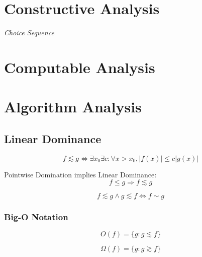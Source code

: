 \section{Constructive Analysis}\label{sec:constructive_analysis}

\emph{Choice Sequence}



\section{Computable Analysis}\label{sec:computable_analysis}

\section{Algorithm Analysis}\label{sec:algorithm_analysis}

\subsection{Linear Dominance}\label{sec:linear_dominance}

\[
    f \lesssim g \Leftrightarrow
    \exists x_0 \exists c : \forall x > x_0, |f(x)| \leq c |g(x)|
\]

Pointwise Domination implies Linear Dominance:
\[
    f \leq g \Rightarrow f \lesssim g
\]

\[
    f \lesssim g \wedge g \lesssim f \Leftrightarrow f \sim g
\]



\subsubsection{Big-O Notation}\label{sec:bigo_notation}

\[
    O(f) = \{ g : g \lesssim f \}
\]

\[
    \Omega(f) = \{ g : g \gtrsim f \}
\]

